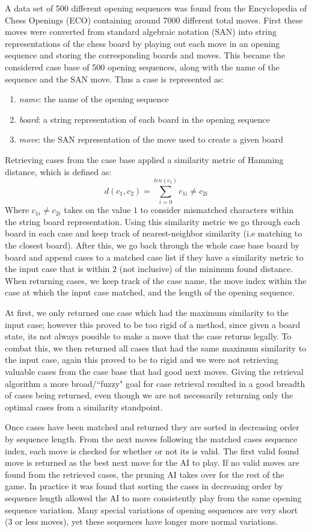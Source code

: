 \documentclass[letterpaper]{article}
\begin{document}
A data set of 500 different opening sequences was found from the Encyclopedia of Chess Openings (ECO) containing around 7000 different total moves. First these moves were converted from standard algebraic notation (SAN) into string representations of the chess board by playing out each move in an opening sequence and storing the corresponding boards and moves. This became the considered case base of 500 opening sequences, along with the name of the sequence and the SAN move. Thus a case is represented as:
\begin{enumerate}[i]
    \item \textit{name}: the name of the opening sequence
    \item \textit{board}: a string representation of each board in the opening sequence
    \item \textit{move}: the SAN representation of the move used to create a given board
\end{enumerate}
Retrieving cases from the case base applied a similarity metric of Hamming distance, which is defined as:
$$
d(c_1,c_2) = \sum_{i=0}^{len(c_1)} c_{1i} \neq c_{2i}
$$
Where $c_{1i} \neq c_{2i}$ takes on the value $1$ to consider mismatched characters within the string board representation. Using this similarity metric we go through each board in each case and keep track of nearest-neighbor similarity (i.e matching to the closest board). After this, we go back through the whole case base board by board and append cases to a matched case list if they have a similarity metric to the input case that is within $2$ (not inclusive) of the minimum found distance. When returning cases, we keep track of the case name, the move index within the case at which the input case matched, and the length of the opening sequence.

At first, we only returned one case which had the maximum similarity to the input case; however this proved to be too rigid of a method, since given a board state, its not always possible to make a move that the case returns legally. To combat this, we then returned all cases that had the same maximum similarity to the input case, again this proved to be to rigid and we were not retrieving valuable cases from the case base that had good next moves. Giving the retrieval algorithm a more broad/``fuzzy" goal for case retrieval resulted in a good breadth of cases being returned, even though we are not necessarily returning only the optimal cases from a similarity standpoint. 

Once cases have been matched and returned they are sorted in decreasing order by sequence length. From the next moves following the matched cases sequence index, each move is checked for whether or not its is valid. The first valid found move is returned as the best next move for the AI to play. If no valid moves are found from the retrieved cases, the pruning AI takes over for the rest of the game.  In practice it was found that sorting the cases in decreasing order by sequence length allowed the AI to more consistently play from the same opening sequence variation. Many special variations of opening sequences are very short (3 or less moves), yet these sequences have longer more normal variations.
\end{document}
